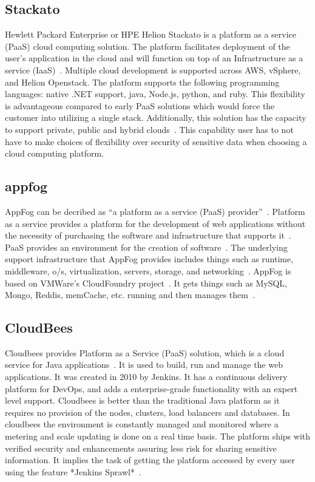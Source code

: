 \subsection{Stackato}
    
Hewlett Packard Enterprise or HPE Helion Stackato is a platform as a
service (PaaS) cloud computing solution.  The platform facilitates
deployment of the user’s application in the cloud and will function on
top of an Infrastructure as a service (IaaS)~\cite{www-hpe}. Multiple
cloud development is supported across AWS, vSphere, and Helion
Openstack.  The platform supports the following programming languages:
native .NET support, java, Node.js, python, and ruby.  This
flexibility is advantageous compared to early PaaS solutions which
would force the customer into utilizing a single stack.  Additionally,
this solution has the capacity to support private, public and hybrid
clouds~\cite{www-virt}. This capability user has to not have to make
choices of flexibility over security of sensitive data when choosing a
cloud computing platform.

    \pv
 
    
\subsection{appfog}

AppFog can be decribed as ``a platform as a service (PaaS)
provider''~\cite{wee}. Platform as a service provides a platform for
the development of web applications without the necessity of
purchasing the software and infrastructure that supports
it~\cite{kepes}. PaaS provides an environment for the creation of
software~\cite{kepes}. The underlying support infrastructure that
AppFog provides includes things such as runtime, middleware, o/s,
virtualization, servers, storage, and networking~\cite{appfog}. AppFog
is based on VMWare’s CloudFoundry project~\cite{wee}. It gets things
such as MySQL, Mongo, Reddis, memCache, etc. running and then manages
them~\cite{tweney}.

    \pv
    
\subsection{CloudBees}

Cloudbees provides Platform as a Service (PaaS) solution, which is a
cloud service for Java applications~\cite{www-cloudbees-wiki}. It is
used to build, run and manage the web applications. It was created in
2010 by Jenkins. It has a continuous delivery platform for DevOps, and
adds a enterprise-grade functionality with an expert level
support. Cloudbees is better than the traditional Java platform as it
requires no provision of the nodes, clusters, load balancers and
databases. In cloudbees the environment is constantly managed and
monitored where a metering and scale updating is done on a real time
basis. The platform ships with verified security and enhancements
assuring less risk for sharing sensitive information. It implies the
task of getting the platform accessed by every user using the feature
*Jenkins Sprawl*~\cite{www-cloudbees-webpage}.

